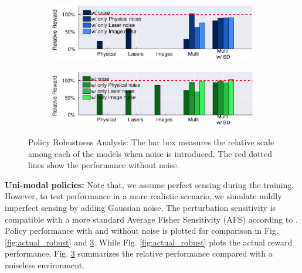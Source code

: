 \documentclass[../thesis.tex]{subfiles}
\begin{document}
\begin{figure}[t]
    \centering
    \begin{subfigure}[b]{0.48\linewidth}
        \includegraphics[width=\columnwidth,trim= 45 180 45 25, clip=true]{./MultimodalDRL/fig/relative_robust_naf}
        \label{fig:relative_robust_naf}
    \end{subfigure}
    \begin{subfigure}[b]{0.48\linewidth}
        \includegraphics[width=\columnwidth,trim= 45 180 45 25, clip=true]{./MultimodalDRL/fig/relative_robust_ddpg}
        \label{fig:relative_robust_ddpg}
    \end{subfigure}
    \caption{Policy Robustness Analysis: The bar box measures the relative scale among each of the models when noise is introduced. The red dotted lines show the performance without noise.}
    \label{fig:relative_robust}
\end{figure}

\textbf{Uni-modal policies:} 
Note that, we assume perfect sensing during the training. However, to test performance in a more realistic scenario, we simulate mildly imperfect sensing by adding Gaussian noise. The perturbation sensitivity is compatible with a more standard Average Fisher Sensitivity (AFS) according to \cite{progressive_net}. Policy performance with and without noise is plotted for comparison in Fig. \ref{fig:actual_robust} and \ref{fig:relative_robust}. While Fig. \ref{fig:actual_robust} plots the actual reward performance, Fig. \ref{fig:relative_robust} summarizes the relative performance compared with a noiseless environment. 
\end{document}
